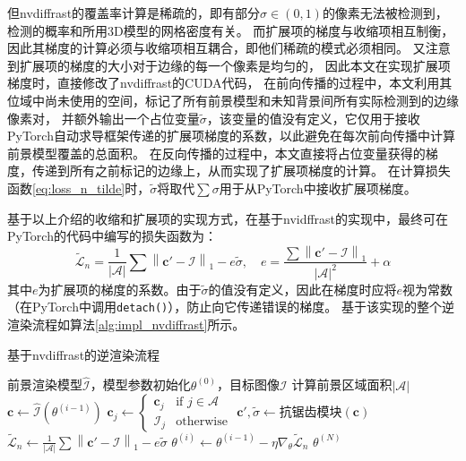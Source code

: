 但nvdiffrast的覆盖率计算是稀疏的，即有部分$\sigma\in(0,1)$的像素无法被检测到，检测的概率和所用3D模型的网格密度有关。
而扩展项的梯度与收缩项相互制衡，因此其梯度的计算必须与收缩项相互耦合，即他们稀疏的模式必须相同。
又注意到扩展项的梯度的大小对于边缘的每一个像素是均匀的，%
因此本文在实现扩展项梯度时，直接修改了nvdiffrast的CUDA代码，
在前向传播的过程中，本文利用其位域中尚未使用的空间，标记了所有前景模型和未知背景间所有实际检测到的边缘像素对，
并额外输出一个占位变量$\tilde{\sigma}$，该变量的值没有定义，它仅用于接收PyTorch自动求导框架传递的扩展项梯度的系数，以此避免在每次前向传播中计算前景模型覆盖的总面积。
在反向传播的过程中，本文直接将占位变量获得的梯度，传递到所有之前标记的边缘上，从而实现了扩展项梯度的计算。
在计算损失函数\eqref{eq:loss_n_tilde}时，$\tilde{\sigma}$将取代$\sum\sigma$用于从PyTorch中接收扩展项梯度。

基于以上介绍的收缩和扩展项的实现方式，在基于nvidffrast的实现中，最终可在PyTorch的代码中编写的损失函数为：
\begin{equation}
\tilde{\mathcal{L}}_n = \frac{1}{|\mathcal{A}|} \sum \left\| \mathbf{c}' - \mathcal{I} \right\|_1 - e \tilde{\sigma},
\quad e = \frac{\sum\left\| \mathbf{c}' - \mathcal{I} \right\|_1}{|\mathcal{A}|^2}+\alpha
\label{eq:loss_n_impl}
\end{equation}
其中$e$为扩展项的梯度的系数。由于$\tilde{\sigma}$的值没有定义，因此在梯度时应将$e$视为常数（在PyTorch中调用\texttt{detach()}），防止向它传递错误的梯度。
基于该实现的整个逆渲染流程如算法\ref{alg:impl_nvdiffrast}所示。
\begin{algorithm}[t]
    \caption{基于nvdiffrast的逆渲染流程}
    \label{alg:impl_nvdiffrast}
    \begin{algorithmic}[1]
        \Require 前景渲染模型$\hat{\mathcal{I}}$，模型参数初始化$\theta^{(0)}$，目标图像$\mathcal{I}$
            \State 计算前景区域面积$|\mathcal{A}|$
                \State $\mathbf{c} \gets \hat{\mathcal{I}}\left(\theta^{(i-1)}\right)$
                \State $\mathbf{c}_j \gets \begin{cases} \mathbf{c}_j &\text{if } j\in\mathcal{A} \\ \mathcal{I}_j &\text{otherwise} \end{cases}$
                \State $\mathbf{c}', \tilde{\sigma} \gets \text{抗锯齿模块}(\mathbf{c})$
                \State $\tilde{\mathcal{L}}_n \gets \frac{1}{|\mathcal{A}|} \sum \left\| \mathbf{c}' - \mathcal{I} \right\|_1 - e \tilde{\sigma}$
                \State $\theta^{(i)} \gets \theta^{(i-1)} - \eta \nabla_{\theta} \tilde{\mathcal{L}}_n$
            \EndFor
            \State \Return $\theta^{(N)}$
        \EndProcedure
    \end{algorithmic}
\end{algorithm}

